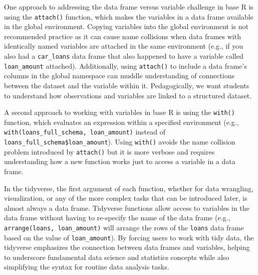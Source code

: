 \documentclass[12pt]{article}
\begin{document}
One approach to addressing the data frame versus variable challenge in
base R is using the \texttt{attach()} function, which makes the
variables in a data frame available in the global environment. Copying
variables into the global environment is not recommended practice
\citep{google-style} as it can cause name collisions when data frames
with identically named variables are attached in the same environment
(e.g., if you also had a \texttt{car\_loans} data frame that also
happened to have a variable called \texttt{loan\_amount} attached).
Additionally, using \texttt{attach()} to include a data frame's columns
in the global namespace can muddle understanding of connections between
the dataset and the variable within it. Pedagogically, we want students
to understand how observations and variables are linked to a structured
dataset.

A second approach to working with variables in base R is using the
\texttt{with()} function, which evaluates an expression within a
specified environment (e.g.,
\texttt{with(loans\_full\_schema,\ loan\_amount)} instead of
\texttt{loans\_full\_schema\$loan\_amount}). Using \texttt{with()}
avoids the name collision problem introduced by \texttt{attach()} but it
is more verbose and requires understanding how a new function works just
to access a variable in a data frame.

In the tidyverse, the first argument of each function, whether for data
wrangling, visualization, or any of the more complex tasks that can be
introduced later, is almost always a data frame. Tidyverse functions
allow access to variables in the data frame without having to re-specify
the name of the data frame (e.g., \texttt{arrange(loans,\ loan\_amount)}
will arrange the rows of the \texttt{loans} data frame based on the
value of \texttt{loan\_amount}). By forcing users to work with tidy
data, the tidyverse emphasizes the connection between data frames and
variables, helping to underscore fundamental data science and statistics
concepts while also simplifying the syntax for routine data analysis
tasks.
\end{document}
